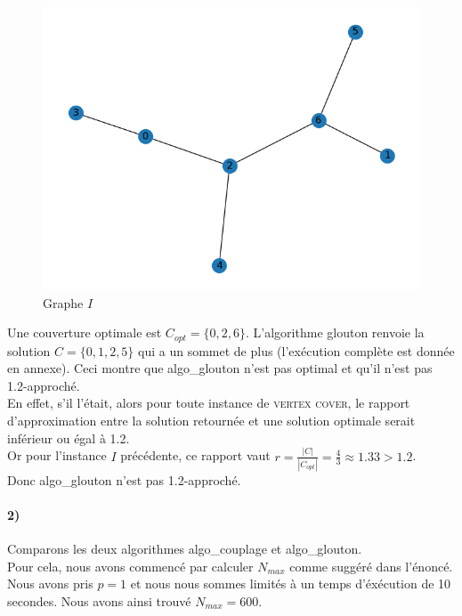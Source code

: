 \documentclass[12pt]{article}
\begin{document}
        \begin{figure}[h]
            \caption{Graphe $I$}
            \includegraphics[scale=0.7]{figures/q3-1.png}
            \centering
        \end{figure}

        Une couverture optimale est $C_{opt} = \{0,2,6\}$. L'algorithme glouton renvoie la solution $C = \{0,1,2,5\}$ qui a un sommet de plus (l'exécution complète est donnée en annexe). Ceci montre que algo\_glouton n'est pas optimal et qu'il n'est pas 1.2-approché. \\
        En effet, s'il l'était, alors pour toute instance de \textsc{vertex cover}, le rapport d'approximation entre la solution retournée et une solution optimale serait inférieur ou égal à 1.2. \\
        Or pour l'instance $I$ précédente, ce rapport vaut $r = \frac{|C|}{|C_{opt}|} = \frac{4}{3} \approx 1.33 > 1.2$. \\
        Donc algo\_glouton n'est pas 1.2-approché.

    \paragraph{2)} Comparons les deux algorithmes algo\_couplage et algo\_glouton. \\
        Pour cela, nous avons commencé par calculer $N_{max}$ comme suggéré dans l'énoncé. Nous avons pris $p = 1$ et nous nous sommes limités à un temps d'éxécution de 10 secondes. Nous avons ainsi trouvé $N_{max} = 600$.
\end{document}
